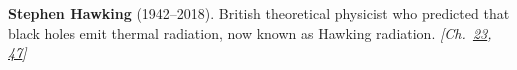 \textbf{Stephen Hawking} (1942–2018). British theoretical physicist who predicted that black holes emit thermal radiation, now known as Hawking radiation. \emph{[Ch.~\hyperref[ch:blackholetimedilationredshift]{23}, \hyperref[ch:observervac]{47}]}

